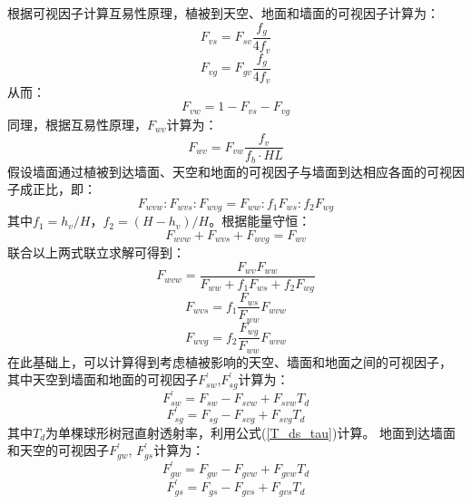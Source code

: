 根据可视因子计算互易性原理，植被到天空、地面和墙面的可视因子计算为：
\begin{equation}
F_{vs}=F_{sv} \frac{f_g}{4 f_v}
\end{equation}
\begin{equation}
F_{vg}=F_{gv} \frac{f_g}{4 f_v}
\end{equation}
从而：
\begin{equation}
F_{v w}=1-F_{v s}-F_{v g}
\end{equation}
同理，根据互易性原理，$F_{wv}$计算为：
\begin{equation}
F_{w v}=F_{v w} \frac{f_{v}}{f_{b} \cdot {HL}}
\end{equation}
假设墙面通过植被到达墙面、天空和地面的可视因子与墙面到达相应各面的可视因子成正比，即：
\begin{equation}
F_{wvw}: F_{wvs}: F_{wvg}=F_{ww}: f_{1} F_{ws}: f_{2} F_{w g}
\end{equation}
其中$f_1=h_v/H$，$f_2=\left(H-h_v\right)/H$。根据能量守恒：
\begin{equation}
F_{wvw}+F_{wvs}+F_{wvg}=F_{w v}
\end{equation}
联合以上两式联立求解可得到：
\begin{equation}
F_{wvw}=\frac{F_{w v} F_{ww}}{F_{ww}+f_{1} F_{ws}+f_{2} F_{w g}}
\end{equation}
\begin{equation}
F_{wvs}=f_{1} \frac{F_{ws}}{F_{ww}} F_{wvw}
\end{equation}
\begin{equation}
F_{wvg}=f_{2} \frac{F_{w g}}{F_{ww}} F_{wvw}
\end{equation}
在此基础上，可以计算得到考虑植被影响的天空、墙面和地面之间的可视因子，
其中天空到墙面和地面的可视因子$F_{sw}^\prime$,$ F_{sg}^\prime$计算为：
\begin{equation}
F_{s w}^{\prime}=F_{s w}-F_{s v w}+F_{s v w} T_{d}
\end{equation}
\begin{equation}
F_{s g}^{\prime}=F_{s g}-F_{s v g}+F_{s v g} T_{d}
\end{equation}
其中$T_d$为单棵球形树冠直射透射率，利用公式(\ref{T_ds_tau})计算。
地面到达墙面和天空的可视因子$F_{gw}^\prime$, $F_{gs}^\prime$计算为：
\begin{equation}
F_{g w}^{\prime}=F_{g w}-F_{g v w}+F_{g v w} T_{d}
\end{equation}
\begin{equation}
F_{gs}^{\prime}=F_{gs}-F_{g v s}+F_{g v s} T_{d}
\end{equation}
